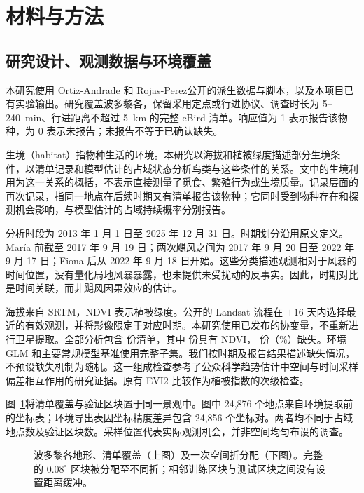 \section{材料与方法}
\subsection{研究设计、观测数据与环境覆盖}
本研究使用 Ortiz-Andrade 和 Rojas-Perez\cite{ortiz2026}公开的派生数据与脚本，以及本项目已有实验输出。研究覆盖波多黎各，保留采用定点或行进协议、调查时长为 5--240~min、行进距离不超过 5~km 的完整 eBird 清单。响应值为 1 表示报告该物种，为 0 表示未报告；未报告不等于已确认缺失。

生境（habitat）指物种生活的环境。本研究以海拔和植被绿度描述部分生境条件，以清单记录和模型估计的占域状态分析鸟类与这些条件的关系。文中的生境利用为这一关系的概括，不表示直接测量了觅食、繁殖行为或生境质量。记录层面的再次记录，指同一地点在后续时期又有清单报告该物种；它同时受到物种存在和探测机会影响，与模型估计的占域持续概率分别报告。

分析时段为 2013 年 1 月 1 日至 2025 年 12 月 31 日。时期划分沿用原文定义。María 前截至 2017 年 9 月 19 日；两次飓风之间为 2017 年 9 月 20 日至 2022 年 9 月 17 日；Fiona 后从 2022 年 9 月 18 日开始。这些分类描述观测相对于风暴的时间位置，没有量化局地风暴暴露，也未提供未受扰动的反事实。因此，时期对比是时间关联，而非飓风因果效应的估计。

海拔来自 SRTM\cite{farr2007}，NDVI 表示植被绿度\cite{tucker1979}。公开的 Landsat 流程在 $\pm16$ 天内选择最近的有效观测，并将影像限定于对应时期。本研究使用已发布的协变量，不重新进行卫星提取。全部分析包含 \nChecklists{} 份清单，其中 \nComplete{} 份具有 NDVI，\nMissingNDVI{} 份（\nMissingPct{}\%）缺失。环境 GLM 和主要常规模型基准使用完整子集。我们按时期及报告结果描述缺失情况，不预设缺失机制为随机。这一组成检查参考了公众科学趋势估计中空间与时间采样偏差相互作用的研究证据\cite{backstrom2025}。原有 EVI2 比较作为植被指数的次级检查\cite{jiang2008}。

图~\ref{fig:area}将清单覆盖与验证区块置于同一景观中。图中 24,876 个地点来自环境提取前的坐标表；环境导出表因坐标精度差异包含 24,856 个坐标对。两者均不同于占域地点数及验证区块数。采样位置代表实际观测机会，并非空间均匀布设的调查。
\begin{figure}[htbp]\centering
{}
\caption{波多黎各地形、清单覆盖（上图）及一次空间折分配（下图）。完整的 $0.08^\circ$ 区块被分配至不同折；相邻训练区块与测试区块之间没有设置距离缓冲。}\label{fig:area}
\end{figure}

